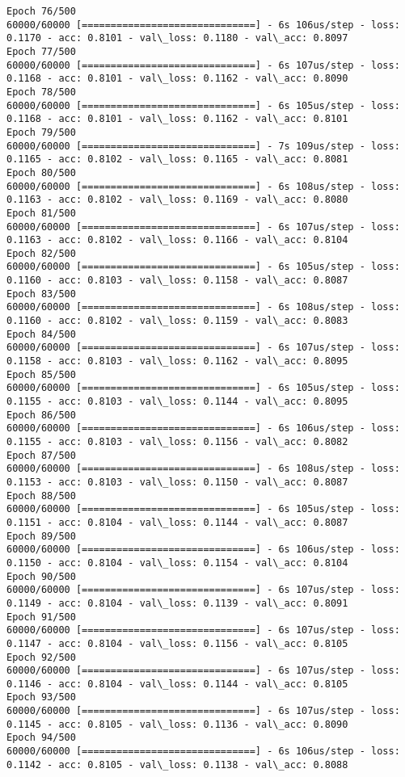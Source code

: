 \documentclass[11pt]{article}
\begin{document}
\begin{Verbatim}[commandchars=\\\{\}]
Epoch 76/500
60000/60000 [==============================] - 6s 106us/step - loss: 0.1170 - acc: 0.8101 - val\_loss: 0.1180 - val\_acc: 0.8097
Epoch 77/500
60000/60000 [==============================] - 6s 107us/step - loss: 0.1168 - acc: 0.8101 - val\_loss: 0.1162 - val\_acc: 0.8090
Epoch 78/500
60000/60000 [==============================] - 6s 105us/step - loss: 0.1168 - acc: 0.8101 - val\_loss: 0.1162 - val\_acc: 0.8101
Epoch 79/500
60000/60000 [==============================] - 7s 109us/step - loss: 0.1165 - acc: 0.8102 - val\_loss: 0.1165 - val\_acc: 0.8081
Epoch 80/500
60000/60000 [==============================] - 6s 108us/step - loss: 0.1163 - acc: 0.8102 - val\_loss: 0.1169 - val\_acc: 0.8080
Epoch 81/500
60000/60000 [==============================] - 6s 107us/step - loss: 0.1163 - acc: 0.8102 - val\_loss: 0.1166 - val\_acc: 0.8104
Epoch 82/500
60000/60000 [==============================] - 6s 105us/step - loss: 0.1160 - acc: 0.8103 - val\_loss: 0.1158 - val\_acc: 0.8087
Epoch 83/500
60000/60000 [==============================] - 6s 108us/step - loss: 0.1160 - acc: 0.8102 - val\_loss: 0.1159 - val\_acc: 0.8083
Epoch 84/500
60000/60000 [==============================] - 6s 107us/step - loss: 0.1158 - acc: 0.8103 - val\_loss: 0.1162 - val\_acc: 0.8095
Epoch 85/500
60000/60000 [==============================] - 6s 105us/step - loss: 0.1155 - acc: 0.8103 - val\_loss: 0.1144 - val\_acc: 0.8095
Epoch 86/500
60000/60000 [==============================] - 6s 106us/step - loss: 0.1155 - acc: 0.8103 - val\_loss: 0.1156 - val\_acc: 0.8082
Epoch 87/500
60000/60000 [==============================] - 6s 108us/step - loss: 0.1153 - acc: 0.8103 - val\_loss: 0.1150 - val\_acc: 0.8087
Epoch 88/500
60000/60000 [==============================] - 6s 105us/step - loss: 0.1151 - acc: 0.8104 - val\_loss: 0.1144 - val\_acc: 0.8087
Epoch 89/500
60000/60000 [==============================] - 6s 106us/step - loss: 0.1150 - acc: 0.8104 - val\_loss: 0.1154 - val\_acc: 0.8104
Epoch 90/500
60000/60000 [==============================] - 6s 107us/step - loss: 0.1149 - acc: 0.8104 - val\_loss: 0.1139 - val\_acc: 0.8091
Epoch 91/500
60000/60000 [==============================] - 6s 107us/step - loss: 0.1147 - acc: 0.8104 - val\_loss: 0.1156 - val\_acc: 0.8105
Epoch 92/500
60000/60000 [==============================] - 6s 107us/step - loss: 0.1146 - acc: 0.8104 - val\_loss: 0.1144 - val\_acc: 0.8105
Epoch 93/500
60000/60000 [==============================] - 6s 107us/step - loss: 0.1145 - acc: 0.8105 - val\_loss: 0.1136 - val\_acc: 0.8090
Epoch 94/500
60000/60000 [==============================] - 6s 106us/step - loss: 0.1142 - acc: 0.8105 - val\_loss: 0.1138 - val\_acc: 0.8088

\end{Verbatim}
\end{document}
